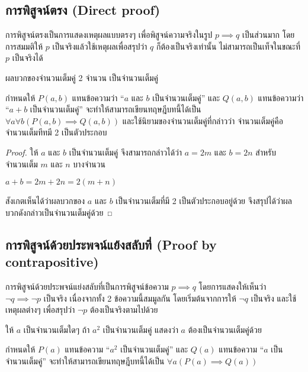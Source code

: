 \subsection{การพิสูจน์ตรง (Direct proof)}

การพิสูจน์ตรงเป็นการแสดงเหตุผลแบบตรงๆ เพื่อพิสูจน์ความจริงในรูป $p \implies q$ เป็นส่วนมาก โดยการสมมติให้ $p$ เป็นจริงแล้วใช้เหตุผลเพื่อสรุปว่า $q$ ก็ต้องเป็นจริงเท่านั้น ไม่สามารถเป็นเท็จในขณะที่ $p$ เป็นจริงได้

\begin{theorem}
ผลบวกของจำนวนเต็มคู่ 2 จำนวน เป็นจำนวนเต็มคู่
\end{theorem}

กำหนดให้ $P(a,b)$ แทนข้อความว่า ``$a$ และ $b$ เป็นจำนวนเต็มคู่'' และ $Q(a,b)$ แทนข้อความว่า ``$a + b$ เป็นจำนวนเต็มคู่'' จะทำให้สามารถเขียนทฤษฎีบทนี้ได้เป็น $\forall a \forall b(P(a,b) \implies Q(a,b))$ และใช้นิยามของจำนวนเต็มคู่ที่กล่าวว่า จำนวนเต็มคู่คือจำนวนเต็มทีทมี 2 เป็นตัวประกอบ

\begin{proof}
ให้ $a$ และ $b$ เป็นจำนวนเต็มคู่ จึงสามารถกล่าวได้ว่า $a = 2m$ และ $b = 2n$ สำหรับจำนวนเต็ม $m$ และ $n$ บางจำนวน

\begin{center}
$a+b = 2m + 2n = 2(m+n)$
\end{center}
สังเกตเห็นได้ว่าผลบวกของ $a$ และ $b$ เป็นจำนวนเต็มที่มี 2 เป็นตัวประกอบอยู่ด้วย จึงสรุปได้ว่าผลบวกดังกล่าวเป็นจำนวนเต็มคู่ด้วย
\end{proof}

\subsection{การพิสูจน์ด้วยประพจน์แย้งสลับที่ (Proof by contrapositive)}

การพิสูจน์ด้วยประพจน์แย่งสลับที่เป็นการพิสูจน์ข้อความ $p \implies q$ โดยการแสดงให้เห็นว่า $\neg q \implies \neg p$ เป็นจริง เนื่องจากทั้ง 2 ข้อความนี้สมมูลกัน โดยเริ่มต้นจากการให้ $\neg q$ เป็นจริง และใช้เหตุผลต่างๆ เพื่อสรุปว่า $\neg p$ ต้องเป็นจริงตามไปด้วย

\begin{theorem}
ให้ $a$ เป็นจำนวนเต็มใดๆ ถ้า $a^2$ เป็นจำนวนเต็มคู่ แสดงว่า $a$ ต้องเป็นจำนวนเต็มคู่ด้วย
\end{theorem}

กำหนดให้ $P(a)$ แทนข้อความ ``$a^2$ เป็นจำนวนเต็มคู่'' และ $Q(a)$ แทนข้อความ ``$a$ เป็นจำนวนเต็มคู่'' จะทำให้สามารถเขียนทฤษฎีบทนี้ได้เป็น $\forall a(P(a) \implies Q(a))$

